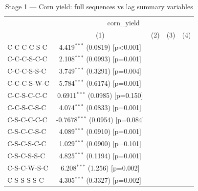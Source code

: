 
\begin{table}[H]
   \caption{\label{tab:corn_jp_mean} Stage 1 — Corn yield: full sequences vs lag summary variables}
   \bigskip
   \centering
   \begin{tabular}{lcccc}
      \toprule
       & \multicolumn{4}{c}{corn\_yield}\\
                                      & (1)                      & (2)                    & (3)                    & (4)\\  
      \midrule 
      C-C-C-C-S-C                     & 4.419$^{***}$ (0.0819) [p<0.001]   &                        &                        &   \\   
      C-C-C-S-C-C                     & 2.108$^{***}$ (0.0993) [p=0.001]   &                        &                        &   \\   
      C-C-C-S-S-C                     & 3.749$^{***}$ (0.3291) [p=0.004]   &                        &                        &   \\   
      C-C-C-S-W-C                     & 5.784$^{***}$ (0.6174) [p=0.001]   &                        &                        &   \\   
      C-C-S-C-C-C                     & 0.6911$^{***}$ (0.0985) [p=0.150]  &                        &                        &   \\   
      C-C-S-C-S-C                     & 4.074$^{***}$ (0.0833) [p=0.001]   &                        &                        &   \\   
      C-S-C-C-C-C                     & -0.7678$^{***}$ (0.0954) [p=0.084] &                        &                        &   \\   
      C-S-C-C-S-C                     & 4.089$^{***}$ (0.0910) [p=0.001]   &                        &                        &   \\   
      C-S-C-S-C-C                     & 1.029$^{***}$ (0.0900) [p=0.101]   &                        &                        &   \\   
      C-S-C-S-S-C                     & 4.825$^{***}$ (0.1194) [p=0.001]   &                        &                        &   \\   
      C-S-C-W-S-C                     & 6.208$^{***}$ (1.256) [p=0.002]    &                        &                        &   \\   
      C-S-S-S-S-C                     & 4.305$^{***}$ (0.3327) [p=0.002]   &                        &                        &   \\   

\end{tabular}
\end{table}
